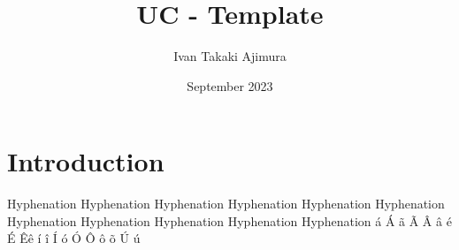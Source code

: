 \documentclass{uc-mse}
\title{UC - Template}
\author{Ivan Takaki Ajimura}
\date{September 2023}
\begin{document}
\maketitle

\section{Introduction}
 Hyphenation Hyphenation Hyphenation Hyphenation Hyphenation Hyphenation Hyphenation Hyphenation Hyphenation Hyphenation Hyphenation á Á ã Ã Â â é É Êê í î Í ó Ó Ô ô õ Ú ú
\end{document}
